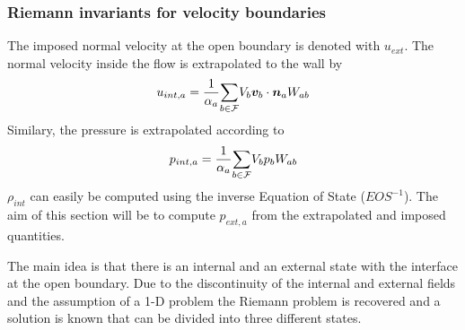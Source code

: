 \documentclass{../GPUSPHtemplate}
\begin{document}
\subsubsection{Riemann invariants for velocity boundaries}
\label{h:open:vel}
The imposed normal velocity at the open boundary is denoted with
$u_{ext}$. The normal velocity inside the flow is extrapolated to the wall
by
\begin{equation}
u_{int,a} = \frac{1}{\alpha_a}\underset{b \in \mathcal{F}}{\sum} V_b \bm{v}_b \cdot \bm{n}_a
W_{ab}
\label{e:open:uint}
\end{equation}
Similary, the pressure is extrapolated according to
\begin{equation}
p_{int,a} = \frac{1}{\alpha_a}\underset{b \in \mathcal{F}}{\sum} V_b p_b W_{ab}
\label{e:open:pint}
\end{equation}
$\rho_{int}$ can easily be computed using the inverse Equation of State
($EOS^{-1}$). The aim of this section will be to compute $p_{ext,a}$
from the extrapolated and imposed quantities.

The main idea is that there is an internal and an external state with
the interface at the open boundary. Due to the discontinuity of the
internal and external fields and the assumption of a 1-D problem the
Riemann problem is recovered and a solution is known that can be divided
into three different states.
\end{document}
